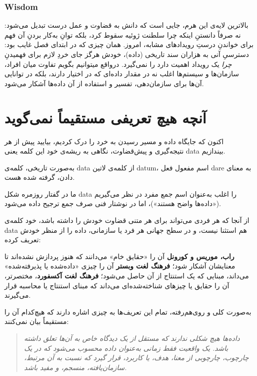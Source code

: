 \subsubsection{Wisdom}
بالاترین لایه‌ی این هرم، جایی است که دانش به قضاوت و عمل درست تبدیل می‌شود: نه صرفاً دانستنِ اینکه چرا سلطنت ژوئیه سقوط کرد، بلکه توانِ به‌کار بردنِ آن فهم برای خواندنِ درستِ رویدادهای مشابه، امروز. همان چیزی که در ابتدای فصل غایب بود: دسترسیِ آنی به هزاران سند تاریخی (داده)، خودش هرگز جای خردِ لازم برای فهمیدنِ \emph{چرا} یک رویداد اهمیت دارد را نمی‌گیرد. درواقع میتوانیم بگویم تفاوت میان افراد، سازمان‌ها و سیستم‌ها اغلب نه در مقدار داده‌ای که در اختیار دارند، بلکه در توانایی آن‌ها برای سازمان‌دهی، تفسیر و استفاده از آن داده‌ها آشکار می‌شود.

\section{آنچه هیچ تعریفی مستقیماً نمی‌گوید}
\label{sec:what-no-definition-says}

اکنون که جایگاه داده و مسیر رسیدن به خرد را درک کردیم، بیایید پیش از هر نتیجه‌گیری و پیش‌قضاوت، نگاهی به ریشه‌ی خود این کلمه یعنی data بیندازیم.

به‌صورت تاریخی، کلمه‌ی data از کلمه‌ی لاتین datum، اسم مفعول فعل dare به معنای دادن، گرفته شده هست.

ما در گفتار روزمره شکل data را اغلب به‌عنوان اسم جمع مفرد در نظر می‌گیریم («داده‌ها واضح هستند»)، اما در نوشتار فنی صرف جمع ترجیح داده می‌شود.

از آنجا که هر فردی می‌تواند برای هر متنی قضاوت خودش را داشته باشد، خود کلمه‌ی data هم استثنا نیست، و در سطح جهانی هر فرد یا سازمانی، داده را از منظر خودش تعریف کرده:

\textbf{راب، موریس و کورونل} آن را «حقایق خام» می‌دانند که هنوز پردازش نشده‌اند تا معنایشان آشکار شود؛
\textbf{فرهنگ لغت وبستر} آن را چیزی «داده‌شده یا پذیرفته‌شده» می‌داند، مبنایی که یک استنتاج از آن حاصل می‌شود؛
\textbf{فرهنگ لغت آکسفورد}، مختصرتر، آن را حقایق یا چیزهای شناخته‌شده‌ای می‌داند که مبنای استنتاج یا محاسبه قرار می‌گیرند.

به‌صورت کلی و روی‌هم‌رفته، تمام این تعریف‌ها به چیزی اشاره دارند که هیچ‌کدام آن را مستقیماً بیان نمی‌کنند:

\begin{quote}
\itshape
داده‌ها هیچ شکلی ندارند که مستقل از یک دیدگاه خاص به آن‌ها تعلق داشته باشد. یک واقعیت فقط زمانی به‌عنوان داده محسوب می‌شود که در یک چارچوب، چارچوبی از معنا، هدف، یا کاربرد، قرار گیرد که نسبت به آن مرتبط، سازمان‌یافته، منسجم، و مفید باشد.
\end{quote}

